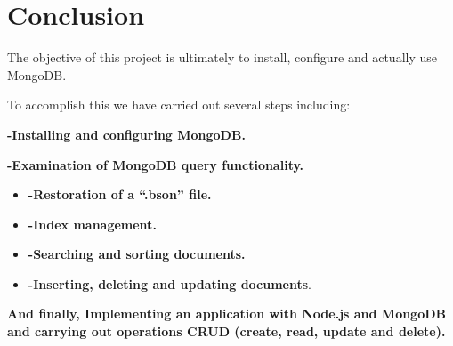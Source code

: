 \chapter*{Conclusion}
\vspace{2cm}
\par \Large The objective of this project is ultimately to install, configure and actually use MongoDB. \\
\par \Large To accomplish this we have carried out several steps including: 

\begin{flushleft} \large
{
\item \textbf{-Installing and configuring MongoDB.} \\[0.7cm]
\item \textbf{-Examination of MongoDB query functionality.}\\[0.7cm]
\begin{itemize}
    \item \textbf {-Restoration of a “.bson” file.} \\[0.7cm]
    \item \textbf {-Index management.} \\[0.7cm]
    \item \textbf {-Searching and sorting documents.} \\[0.7cm]
    \item \textbf {-Inserting, deleting and updating documents}. \\[0.7cm]
\end{itemize}
\item \textbf{And finally, Implementing an application with Node.js and MongoDB and carrying out operations
CRUD (create, read, update and delete).}\\[0.7cm]
\item
}

\end{flushleft}


\newpage